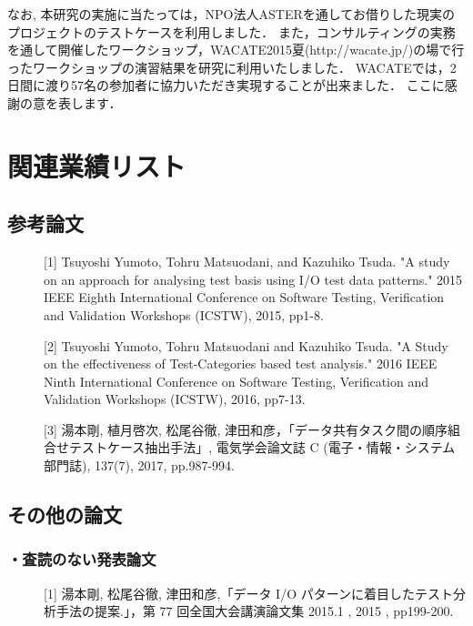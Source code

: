 \documentclass[a4paper,12pt]{jreport}
\begin{document}
なお, 本研究の実施に当たっては，NPO法人ASTERを通してお借りした現実のプロジェクトのテストケースを利用しました．
また，コンサルティングの実務を通して開催したワークショップ，WACATE2015夏(http://wacate.jp/)の場で行ったワークショップの演習結果を研究に利用いたしました．
WACATEでは，2日間に渡り57名の参加者に協力いただき実現することが出来ました．
ここに感謝の意を表します．



  
  

\chapter*{関連業績リスト}
\section*{参考論文}
\begin{description}
  \item[] [1] Tsuyoshi Yumoto, Tohru Matsuodani, and Kazuhiko Tsuda. "A study on an approach for analysing test basis using I/O test data patterns." 2015 IEEE Eighth International Conference on Software Testing, Verification and Validation Workshops (ICSTW), 2015, pp1-8.
  \item[] [2] Tsuyoshi Yumoto, Tohru Matsuodani and Kazuhiko Tsuda. "A Study on the effectiveness of Test-Categories based test analysis." 2016 IEEE Ninth International Conference on Software Testing, Verification and Validation Workshops (ICSTW), 2016, pp7-13.
  \item[] [3] 湯本剛, 植月啓次, 松尾谷徹, 津田和彦，「データ共有タスク間の順序組合せテストケース抽出手法」, 電気学会論文誌 C (電子・情報・システム部門誌), 137(7), 2017, pp.987-994.
\end{description}

\section*{その他の論文}
\subsection*{・査読のない発表論文}
\begin{description}
  \item[] [1] 湯本剛, 松尾谷徹, 津田和彦,「データ I/O パターンに着目したテスト分析手法の提案.」，第 77 回全国大会講演論文集 2015.1 , 2015 , pp199-200.
\end{description}
\end{document}
